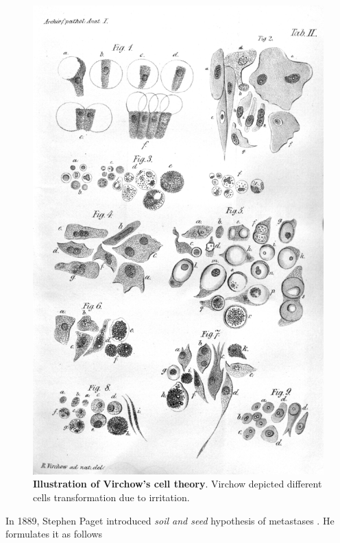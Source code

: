 \documentclass[12pt,]{book}
\theoremstyle{definition}
\theoremstyle{definition}
\theoremstyle{definition}
\theoremstyle{remark}
\begin{document}
\begin{figure}

{\centering \includegraphics[width=1\linewidth]{figures-ext/01-Virchow-cell} 

}

\caption[Illustration of Virchow's cell theory]{\textbf{Illustration of Virchow's cell
theory}. Virchow depicted different cells transformation due to
irritation. \citep{VirchowRudolf1847}}\label{fig:Virchow-cell}
\end{figure}





In 1889, Stephen Paget introduced \emph{soil and seed} hypothesis of
metastases \citep{Paget1889}. He formulates it as follows
\end{document}
